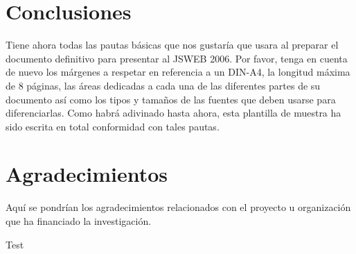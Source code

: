 \documentclass[10pt,a4paper,twoside]{article}
\begin{document}
\begin{multicols}{2}
    \section{Conclusiones}

    Tiene ahora todas las pautas básicas que nos gustaría que usara al preparar el documento definitivo para presentar al JSWEB 2006. Por favor, tenga en cuenta de nuevo los márgenes a respetar en referencia a un DIN-A4, la longitud máxima de 8 páginas, las áreas dedicadas a cada una de las diferentes partes de su documento así como los tipos y tamaños de las fuentes que deben usarse para diferenciarlas. Como habrá adivinado hasta ahora, esta plantilla de muestra ha sido escrita en total conformidad con tales pautas.

    \section{Agradecimientos}

    Aquí se pondrían los agradecimientos relacionados con el proyecto u organización que ha financiado la investigación.

    Test \cite{cicflowpost}

    

\end{multicols}
\end{document}
